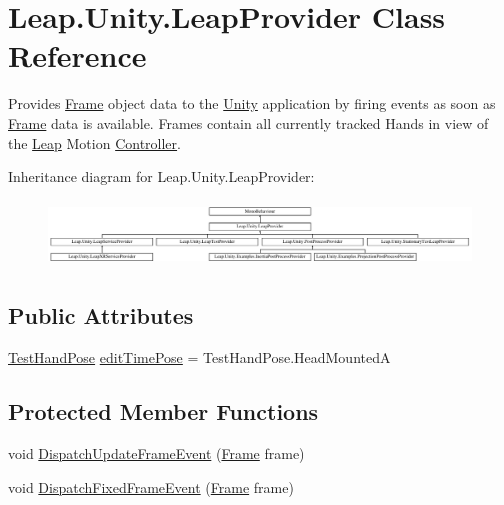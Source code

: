 \hypertarget{class_leap_1_1_unity_1_1_leap_provider}{}\section{Leap.\+Unity.\+Leap\+Provider Class Reference}
\label{class_leap_1_1_unity_1_1_leap_provider}


Provides \mbox{\hyperlink{class_leap_1_1_frame}{Frame}} object data to the \mbox{\hyperlink{namespace_leap_1_1_unity}{Unity}} application by firing events as soon as \mbox{\hyperlink{class_leap_1_1_frame}{Frame}} data is available. Frames contain all currently tracked Hands in view of the \mbox{\hyperlink{namespace_leap_1_1_unity_1_1_leap}{Leap}} Motion \mbox{\hyperlink{class_leap_1_1_controller}{Controller}}.  


Inheritance diagram for Leap.\+Unity.\+Leap\+Provider\+:\begin{figure}[H]
\begin{center}
\leavevmode
\includegraphics[height=1.766562cm]{class_leap_1_1_unity_1_1_leap_provider}
\end{center}
\end{figure}
\subsection*{Public Attributes}
\begin{DoxyCompactItemize}
\item 
\mbox{\hyperlink{namespace_leap_1_1_unity_acd6a6baee36c0cbe733c12b87791f963}{Test\+Hand\+Pose}} \mbox{\hyperlink{class_leap_1_1_unity_1_1_leap_provider_a80150ace9cb1c6681fb2d41792ede8f3}{edit\+Time\+Pose}} = Test\+Hand\+Pose.\+Head\+MountedA
\end{DoxyCompactItemize}
\subsection*{Protected Member Functions}
\begin{DoxyCompactItemize}
\item 
void \mbox{\hyperlink{class_leap_1_1_unity_1_1_leap_provider_a2b90958e448e8f556d2b9c9af4a9547c}{Dispatch\+Update\+Frame\+Event}} (\mbox{\hyperlink{class_leap_1_1_frame}{Frame}} frame)
\item 
void \mbox{\hyperlink{class_leap_1_1_unity_1_1_leap_provider_af7fdbc4bae6cb0508424b8c3bdbb4ce1}{Dispatch\+Fixed\+Frame\+Event}} (\mbox{\hyperlink{class_leap_1_1_frame}{Frame}} frame)
\end{DoxyCompactItemize}
